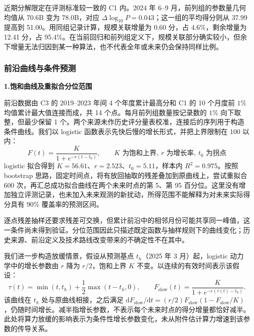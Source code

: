 近期分解限定在评测标准较一致的 C1 内。2024 年 6--9 月，前列组的参数量几何均值从 70.6B 变为 78.0B，对应 $\Delta\log_{10}P=0.043$；这一组的平均得分则从 37.99 提高到 51.00。用同组记录计算，规模关联增量为 0.60 分，占 4.6\%，剩余增量为 12.41 分，占 95.4\%。在当前回归和前列组定义下，规模关联部分确实较小，但余下增量无法归因到某一种算法，也不代表全年或未来仍会保持同样比例。

\subsubsection{前沿曲线与条件预测}

\textbf{1.饱和曲线及重拟合分位范围}\par\nopagebreak[4]
前沿数据由 C3 的 2019--2023 年间 4 个年度累计最高分和 C1 的 10 个月度前 $1\%$ 均值累计最大值连接而成，共 14 个点。每月前列组数量按记录数的 $1\%$ 向下取整，但最少保留 1 个。两个来源未作历史评分量表校准，连接后的序列用于构造条件曲线。我们以 logistic 函数表示先快后慢的增长形式，并把上界限制在 100 以内：
\begin{equation}
    F(t) = \frac{K}{1+e^{-r(t-t_0)}},\qquad K \text{ 为饱和上界},\ r \text{ 为增长率},\ t_0 \text{ 为拐点}
\end{equation}
logistic 拟合得到 $K=56.61$、$r=2.523$、$t_0=5.11$，样本内 $R^2=0.975$。按照 bootstrap 思路\cite{efron1979bootstrap}，固定时间点，将有放回抽取的残差叠加到原曲线上，尝试重拟合 600 次，再汇总成功拟合曲线在两个未来时点的第 5、第 95 百分位。这里没有增加独立评测记录，也未加入未来观测的新扰动，所得范围不能解释为对未来实际得分具有 $90\%$ 覆盖率的预测区间。

逐点残差抽样还要求残差可交换，但累计前沿中的相邻月份可能共享同一峰值，这一条件尚未得到验证。分位范围因此只描述既定函数与抽样规则下的曲线变化；历史来源、前沿定义及技术路线改变带来的不确定性不在其中。

我们进一步构造放缓情景，假设从预测基点 $t_h$（2025 年 3 月）起，logistic 动力学中的增长参数由 $r$ 降为 $r/2$，饱和上界 $K$ 不变。以连续的有效时间表示该假设：
\begin{equation}
    \tau(t)=\min(t,t_h)+\frac12\max(t-t_h,0),\qquad
    F_{\text{slow}}(t)=\frac{K}{1+e^{-r(\tau(t)-t_0)}}.
\end{equation}
该曲线在 $t_h$ 处与原曲线相接，之后满足 $\mathrm dF_{\text{slow}}/\mathrm dt=(r/2)F_{\text{slow}}(1-F_{\text{slow}}/K)$，仍随时间增长。减半指增长参数，不表示每个未来时点的得分增量都恰好减半。此处将算力放缓的影响表示为条件性增长参数变化，未从附件估计算力增速到该参数的传导关系。

